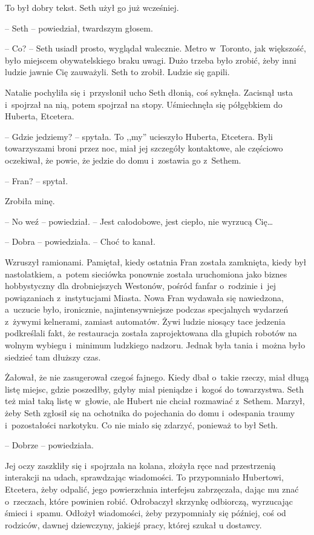 \documentclass[oneside,polish,11pt,sfheadings]{mwbk}
\begin{document}
To był dobry tekst. Seth użył go już wcześniej. 

-- Seth -- powiedział,
twardszym głosem.

-- Co? -- Seth usiadł prosto, wyglądał walecznie. Metro w~Toronto, jak
większość, było miejscem obywatelskiego braku uwagi. Dużo trzeba było
zrobić, żeby inni ludzie jawnie Cię zauważyli. Seth to zrobił. Ludzie
się gapili.

Natalie pochyliła się i~przysłonił ucho Seth dłonią, coś syknęła.
Zacisnął usta i~spojrzał na nią, potem spojrzał na stopy. Uśmiechnęła
się półgębkiem do Huberta, Etcetera.

-- Gdzie jedziemy? -- spytała. To ,,my'' ucieszyło Huberta, Etcetera. Byli
towarzyszami broni przez noc, miał jej szczegóły kontaktowe, ale
częściowo oczekiwał, że powie, że jedzie do domu i~zostawia go z~Sethem.

-- Fran? -- spytał.

Zrobiła minę.

-- No weź -- powiedział. -- Jest całodobowe, jest ciepło, nie wyrzucą
Cię\ldots 

-- Dobra -- powiedziała. -- Choć to kanał.

Wzruszył ramionami. Pamiętał, kiedy ostatnia Fran została zamknięta,
kiedy był nastolatkiem, a~potem sieciówka ponownie została uruchomiona
jako biznes hobbystyczny dla drobniejszych Westonów, pośród fanfar o~rodzinie i~jej powiązaniach z~instytucjami Miasta. Nowa Fran wydawała
się nawiedzona, a~uczucie było, ironicznie, najintensywniejsze podczas
specjalnych wydarzeń z~żywymi kelnerami, zamiast automatów. Żywi ludzie
niosący tace jedzenia podkreślali fakt, że restauracja została
zaprojektowana dla głupich robotów na wolnym wybiegu i~minimum ludzkiego
nadzoru. Jednak była tania i~można było siedzieć tam dłuższy czas.

Żałował, że nie zasugerował czegoś fajnego. Kiedy dbał o~takie rzeczy,
miał długą listę miejsc, gdzie poszedłby, gdyby miał pieniądze i~kogoś
do towarzystwa. Seth też miał taką listę w~głowie, ale Hubert nie chciał
rozmawiać z~Sethem. Marzył, żeby Seth zgłosił się na ochotnika do
pojechania do domu i~odespania traumy i~pozostałości narkotyku. Co nie
miało się zdarzyć, ponieważ to był Seth.

-- Dobrze -- powiedziała.

Jej oczy zaszkliły się i~spojrzała na kolana, złożyła ręce nad
przestrzenią interakcji na udach, sprawdzając wiadomości. To
przypomniało Hubertowi, Etcetera, żeby odpalić, jego powierzchnia
interfejsu zabrzęczała, dając mu znać o~rzeczach, które powinien robić.
Odrobaczył skrzynkę odbiorczą, wyrzucając śmieci i~spamu. Odłożył
wiadomości, żeby przypomniały się później, coś od rodziców, dawnej
dziewczyny, jakiejś pracy, której szukał u dostawcy.
\end{document}
